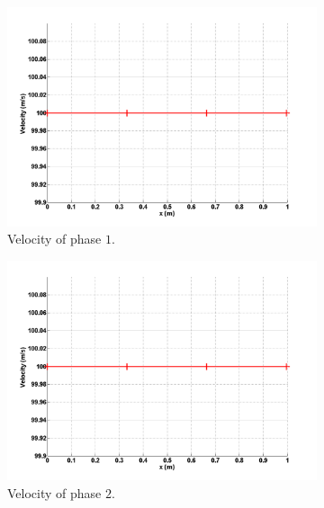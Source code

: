 %
\begin{figure}[H]
        \centering
        \begin{subfigure}[b]{0.495\textwidth}
                \centering
                \includegraphics[width=\textwidth]{figures/liquid_velocity.png}
                \caption{Velocity of phase $1$.}
                \label{vel-vap-7-eqn-sect4}
        \end{subfigure}%
        \begin{subfigure}[b]{0.495\textwidth}
                \centering
                \includegraphics[width=\textwidth]{figures/vapor_velocity.png}
                \caption{Velocity of phase $2$.}
                \label{vel-vap-7-eqn-sect4}
        \end{subfigure}
        \caption{\label{fig:inlet_sct3}}
\end{figure}
